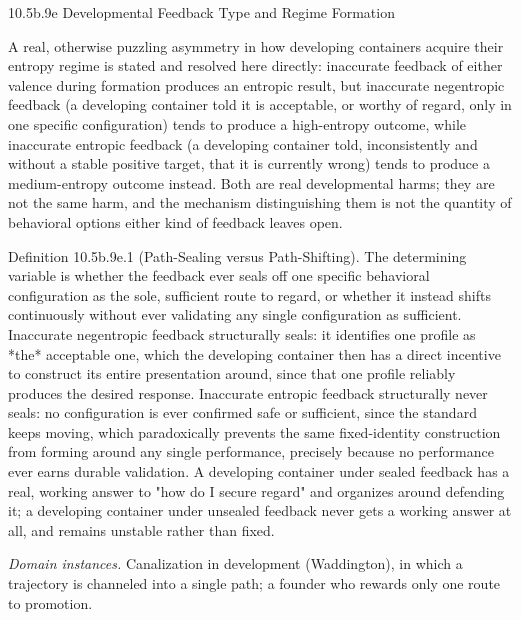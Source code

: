 \documentclass[
]{article}
\begin{document}
10.5b.9e Developmental Feedback Type and Regime Formation

A real, otherwise puzzling asymmetry in how developing containers
acquire their entropy regime is stated and resolved here directly:
inaccurate feedback of either valence during formation produces an
entropic result, but inaccurate negentropic feedback (a developing
container told it is acceptable, or worthy of regard, only in one
specific configuration) tends to produce a high-entropy outcome, while
inaccurate entropic feedback (a developing container told,
inconsistently and without a stable positive target, that it is
currently wrong) tends to produce a medium-entropy outcome instead. Both
are real developmental harms; they are not the same harm, and the
mechanism distinguishing them is not the quantity of behavioral options
either kind of feedback leaves open.

Definition 10.5b.9e.1 (Path-Sealing versus Path-Shifting). The
determining variable is whether the feedback ever seals off one specific
behavioral configuration as the sole, sufficient route to regard, or
whether it instead shifts continuously without ever validating any
single configuration as sufficient. Inaccurate negentropic feedback
structurally seals: it identifies one profile as *the* acceptable one,
which the developing container then has a direct incentive to construct
its entire presentation around, since that one profile reliably produces
the desired response. Inaccurate entropic feedback structurally never
seals: no configuration is ever confirmed safe or sufficient, since the
standard keeps moving, which paradoxically prevents the same
fixed-identity construction from forming around any single performance,
precisely because no performance ever earns durable validation. A
developing container under sealed feedback has a real, working answer to
"how do I secure regard" and organizes around defending it; a developing
container under unsealed feedback never gets a working answer at all,
and remains unstable rather than fixed.

\emph{Domain instances.} Canalization in development (Waddington), in
which a trajectory is channeled into a single path; a founder who
rewards only one route to promotion.
\end{document}
